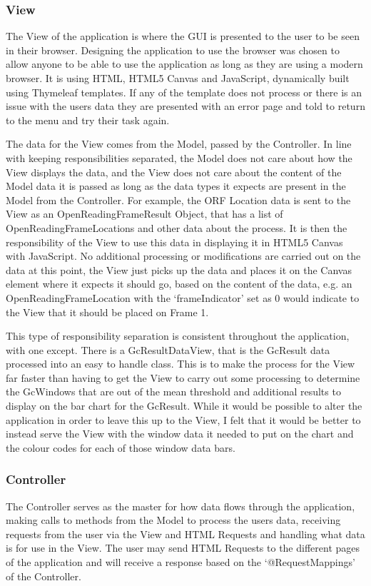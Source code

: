 \subsubsection{View}
The View of the application is where the GUI is presented to the user to be seen in their browser. Designing the application to use the browser was chosen to allow anyone to be able to use the application as long as they are using a modern browser. It is using HTML, HTML5 Canvas and JavaScript, dynamically built using Thymeleaf templates. If any of the template does not process or there is an issue with the users data they are presented with an error page and told to return to the menu and try their task again.

The data for the View comes from the Model, passed by the Controller. In line with keeping responsibilities separated, the Model does not care about how the View displays the data, and the View does not care about the content of the Model data it is passed as long as the data types it expects are present in the Model from the Controller. For example, the ORF Location data is sent to the View as an OpenReadingFrameResult Object, that has a list of OpenReadingFrameLocations and other data about the process. It is then the responsibility of the View to use this data in displaying it in HTML5 Canvas with JavaScript. No additional processing or modifications are carried out on the data at this point, the View just picks up the data and places it on the Canvas element where it expects it should go, based on the content of the data, e.g. an OpenReadingFrameLocation with the `frameIndicator' set as 0 would indicate to the View that it should be placed on Frame 1.

This type of responsibility separation is consistent throughout the application, with one except. There is a GcResultDataView, that is the GcResult data processed into an easy to handle class. This is to make the process for the View far faster than having to get the View to carry out some processing to determine the GcWindows that are out of the mean threshold and additional results to display on the bar chart for the GcResult. While it would be possible to alter the application in order to leave this up to the View, I felt that it would be better to instead serve the View with the window data it needed to put on the chart and the colour codes for each of those window data bars.

\subsubsection{Controller}
The Controller serves as the master for how data flows through the application, making calls to methods from the Model to process the users data, receiving requests from the user via the View and HTML Requests and handling what data is for use in the View. The user may send HTML Requests to the different pages of the application and will receive a response based on the `@RequestMappings' of the Controller. 


